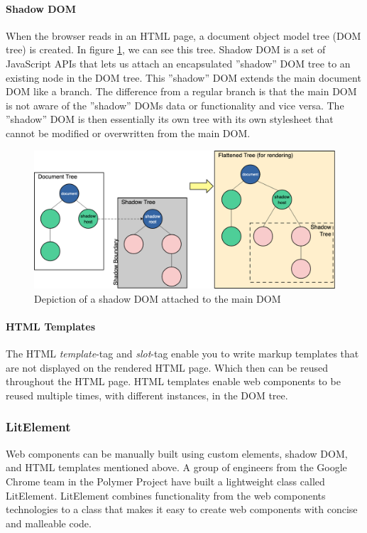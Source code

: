 \paragraph{Shadow DOM}%
\label{ssub:Shadow DOM}
When the browser reads in an HTML page, a document object model tree (DOM tree) is created.  In figure \ref{fig:shadow}, we can see this tree. Shadow DOM is a set of JavaScript APIs that lets us attach an encapsulated ''shadow'' DOM tree to an existing node in the DOM tree. This ''shadow'' DOM extends the main document DOM like a branch. The difference from a regular branch is that the main DOM is not aware of the ''shadow'' DOMs data or functionality and vice versa. The ''shadow'' DOM is then essentially its own tree with its own stylesheet that cannot be modified or overwritten from the main DOM.\\
\begin{figure}[H]
  \centering
  \includegraphics[width=0.8\linewidth]{images/shadow.png}
  \caption{Depiction of a shadow DOM attached to the main DOM}%
  \label{fig:shadow}
\end{figure}




\paragraph{HTML Templates}%
\label{ssub:HMTL Templates}
The HTML \textit{template}-tag and \textit{slot}-tag enable you to write markup templates that are not displayed on the rendered HTML page. Which then can be reused throughout the HTML page. HTML templates enable web components to be reused multiple times, with different instances, in the DOM tree.

\subsubsection{LitElement}%
\label{ssub:LitElement}
Web components can be manually built using custom elements, shadow DOM, and HTML templates mentioned above. A group of engineers from the Google Chrome team in the Polymer Project \cite{polymerPolymerProject} have built a lightweight class called LitElement. LitElement combines functionality from the web components technologies to a class that makes it easy to create web components with concise and malleable code.


